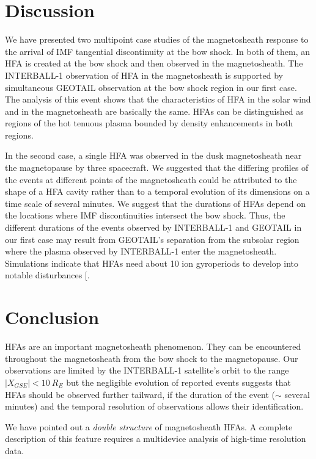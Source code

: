 \documentclass[11pt]{article}
\begin{document}
\begin{article}
\section{Discussion}
We have presented two multipoint case studies of the
magnetosheath response to the arrival of  IMF tangential
discontinuity at the bow shock.
In both of them, an HFA is created at the bow shock and then
observed in the magnetosheath. The INTERBALL-1 observation of HFA
in the magnetosheath is supported by simultaneous GEOTAIL
observation at the bow shock region in our first case. The analysis
of this event shows that the characteristics of HFA in the
solar wind and in the magnetosheath are basically the same. HFAs
can be distinguished as regions of the hot tenuous plasma bounded
by density enhancements in both regions.

In the second case, a single HFA was observed in the dusk magnetosheath
near the magnetopause by three spacecraft.
We suggested that the differing profiles of the
events at different points of the magnetosheath could be attributed
to the shape of a HFA cavity rather than to a temporal evolution of
its dimensions on a time scale of several minutes.
We suggest that the durations of HFAs depend on the locations
where IMF discontinuities intersect the bow shock.
Thus, the different durations of the events observed by
INTERBALL-1 and GEOTAIL  in our first case  may result from
GEOTAIL's separation from the subsolar region where the plasma
observed by INTERBALL-1 enter the magnetosheath.
Simulations indicate that HFAs need about 10
ion gyroperiods to develop into notable disturbances [\markcite{{\it
Thomas et al.}, 1991]}.

\section{Conclusion}
HFAs are an important magnetosheath phenomenon.
They can be encountered throughout the
magnetosheath from the bow shock to the magnetopause. Our
observations are limited by the INTERBALL-1 satellite's orbit to the
range $|X_{GSE}| < 10\> R_E$ but the negligible evolution of reported
events suggests that HFAs should be observed further tailward, if the
duration of the event ($\sim$ several minutes) and the temporal
resolution of observations allows their identification.

We have pointed out a {\it double structure} of magnetosheath
HFAs. A complete description of this feature requires a
multidevice analysis of high-time resolution data.


\end{article}
\end{document}

